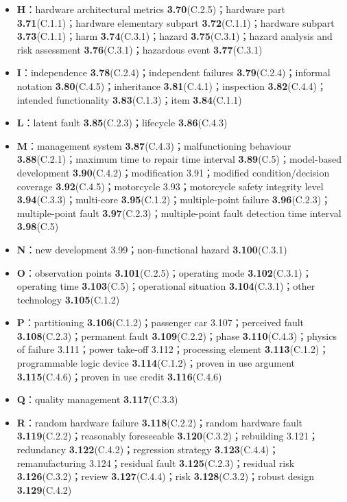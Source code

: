 \begin{itemize}
\item \textbf{H}：hardware architectural metrics \textbf{3.70}(C.2.5)；hardware part \textbf{3.71}(C.1.1)；hardware elementary subpart \textbf{3.72}(C.1.1)；hardware subpart \textbf{3.73}(C.1.1)；harm \textbf{3.74}(C.3.1)；hazard \textbf{3.75}(C.3.1)；hazard analysis and risk assessment \textbf{3.76}(C.3.1)；hazardous event \textbf{3.77}(C.3.1)
\item \textbf{I}：independence \textbf{3.78}(C.2.4)；independent failures \textbf{3.79}(C.2.4)；informal notation \textbf{3.80}(C.4.5)；inheritance \textbf{3.81}(C.4.1)；inspection \textbf{3.82}(C.4.4)；intended functionality \textbf{3.83}(C.1.3)；item \textbf{3.84}(C.1.1)
\item \textbf{L}：latent fault \textbf{3.85}(C.2.3)；lifecycle \textbf{3.86}(C.4.3)
\item \textbf{M}：management system \textbf{3.87}(C.4.3)；malfunctioning behaviour \textbf{3.88}(C.2.1)；maximum time to repair time interval \textbf{3.89}(C.5)；model-based development \textbf{3.90}(C.4.2)；modification 3.91；modified condition/decision coverage \textbf{3.92}(C.4.5)；motorcycle 3.93；motorcycle safety integrity level \textbf{3.94}(C.3.3)；multi-core \textbf{3.95}(C.1.2)；multiple-point failure \textbf{3.96}(C.2.3)；multiple-point fault \textbf{3.97}(C.2.3)；multiple-point fault detection time interval \textbf{3.98}(C.5)
\item \textbf{N}：new development 3.99；non-functional hazard \textbf{3.100}(C.3.1)
\item \textbf{O}：observation points \textbf{3.101}(C.2.5)；operating mode \textbf{3.102}(C.3.1)；operating time \textbf{3.103}(C.5)；operational situation \textbf{3.104}(C.3.1)；other technology \textbf{3.105}(C.1.2)
\item \textbf{P}：partitioning \textbf{3.106}(C.1.2)；passenger car 3.107；perceived fault \textbf{3.108}(C.2.3)；permanent fault \textbf{3.109}(C.2.2)；phase \textbf{3.110}(C.4.3)；physics of failure 3.111；power take-off 3.112；processing element \textbf{3.113}(C.1.2)；programmable logic device \textbf{3.114}(C.1.2)；proven in use argument \textbf{3.115}(C.4.6)；proven in use credit \textbf{3.116}(C.4.6)
\item \textbf{Q}：quality management \textbf{3.117}(C.3.3)
\item \textbf{R}：random hardware failure \textbf{3.118}(C.2.2)；random hardware fault \textbf{3.119}(C.2.2)；reasonably foreseeable \textbf{3.120}(C.3.2)；rebuilding 3.121；redundancy \textbf{3.122}(C.4.2)；regression strategy \textbf{3.123}(C.4.4)；remanufacturing 3.124；residual fault \textbf{3.125}(C.2.3)；residual risk \textbf{3.126}(C.3.2)；review \textbf{3.127}(C.4.4)；risk \textbf{3.128}(C.3.2)；robust design \textbf{3.129}(C.4.2)

\end{itemize}
